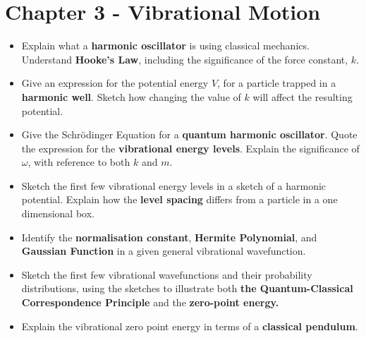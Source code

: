 \documentclass{memoir}[11pt,oneside,a4paper,openany]
\begin{document}
\section*{Chapter 3 - Vibrational Motion}
\begin{itemize}
	\item Explain what a \textbf{harmonic oscillator} is using classical mechanics. Understand \textbf{Hooke's Law}, including the significance of the force constant, $k$.
	\item Give an expression for the potential energy $V$, for a particle trapped in a \textbf{harmonic well}. Sketch how changing the value of $k$ will affect the resulting potential.
	\item Give the Schr{\"o}dinger Equation for a \textbf{quantum harmonic oscillator}. Quote the expression for the \textbf{vibrational energy levels}. Explain the significance of $\omega$, with reference to both $k$ and $m$. 
	\item Sketch the first few vibrational energy levels in a sketch of a harmonic potential. Explain how the \textbf{level spacing} differs from a particle in a one dimensional box.
	\item Identify the \textbf{normalisation constant}, \textbf{Hermite Polynomial}, and \textbf{Gaussian Function} in a given general vibrational wavefunction. 
	\item Sketch the first few vibrational wavefunctions and their probability distributions, using the sketches to illustrate both \textbf{the Quantum-Classical Correspondence Principle} and the \textbf{zero-point energy.}
	\item Explain the vibrational zero point energy in terms of a \textbf{classical pendulum}.
\end{itemize}
\end{document}
